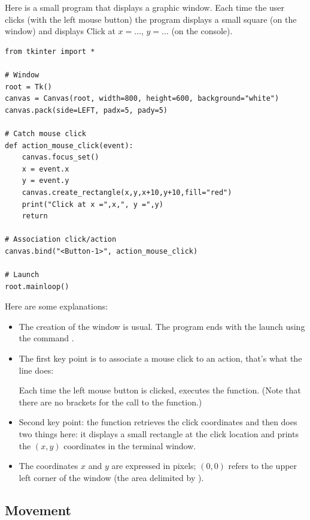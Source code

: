 \documentclass[11pt,class=report,crop=false]{standalone}
\begin{document}
Here is a small program that displays a graphic window. Each time the user clicks (with the left mouse button) the program displays a small square (on the window) and displays \og{}Click at $x=\ldots$, $y=\ldots$\fg{} (on the console).

\begin{lstlisting}
from tkinter import *

# Window
root = Tk()
canvas = Canvas(root, width=800, height=600, background="white")
canvas.pack(side=LEFT, padx=5, pady=5)

# Catch mouse click
def action_mouse_click(event):
    canvas.focus_set()
    x = event.x
    y = event.y
    canvas.create_rectangle(x,y,x+10,y+10,fill="red")
    print("Click at x =",x,", y =",y)
    return

# Association click/action
canvas.bind("<Button-1>", action_mouse_click)

# Launch
root.mainloop()
\end{lstlisting}


Here are some explanations:
\begin{itemize}
  \item The creation of the window is usual. The program ends with the launch using the command  .
  
  \item The first key point is to associate a mouse click to an action, that's what the line does: 

Each time the left mouse button is clicked, \Python{} executes the  function. (Note that there are no brackets for the call to the function.)

   \item Second key point: the  function retrieves the click coordinates and then does two things here: it displays a small rectangle at the click location and prints the $(x,y)$ coordinates in the terminal window.
   
   \item The coordinates $x$ and $y$ are expressed in pixels; $(0,0)$ refers to the upper left corner of the window (the area delimited by ).
\end{itemize}


\subsection{Movement}
\end{document}
